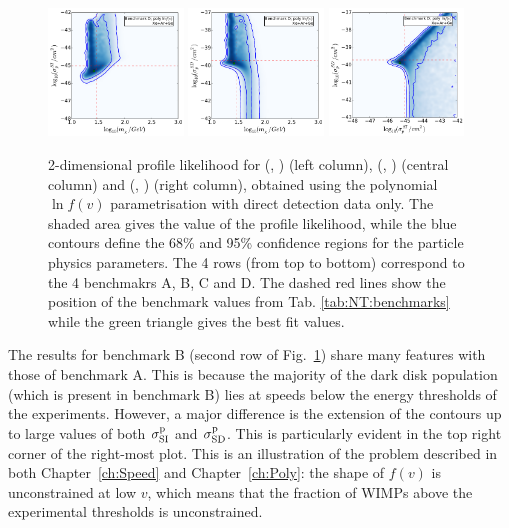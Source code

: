 \begin{figure}[pht!]
  \includegraphics[trim=0.2cm 0.2cm 0.2cm 0.2cm, clip,width=0.32\textwidth]{NT/BenchmarkD_poly_noIC-mx_sigsi.pdf}
  \includegraphics[trim=0.2cm 0.2cm 0.2cm 0.2cm, clip,width=0.32\textwidth]{NT/BenchmarkD_poly_noIC-mx_sigsd.pdf}
  \includegraphics[trim=0.2cm 0.2cm 0.2cm 0.2cm, clip,width=0.32\textwidth]{NT/BenchmarkD_poly_noIC-sigsi_sigsd.pdf}
\caption[Reconstructions of the WIMP mass, SI cross section and SD cross section using direct detection data only]{2-dimensional profile likelihood for (\mchi, \sigmapsi) (left column), (\mchi, \sigmapsd) (central column) and (\sigmapsi, \sigmapsd) (right column), obtained using the polynomial $\ln f(v)$ parametrisation with direct detection data only. The shaded area gives the value of the profile likelihood, while the blue contours define the 68\% and 95\% confidence regions for the particle physics parameters. The 4 rows (from top to bottom) correspond to the 4 benchmakrs A, B, C and D. The dashed red lines show the position of the benchmark values from Tab. \ref{tab:NT:benchmarks} while the green triangle gives the best fit values.}
\label{fig:NT:withoutIC}
\end{figure}

The results for benchmark B (second row of Fig.~\ref{fig:NT:withoutIC}) share many features with those of benchmark A. This is because the majority of the dark disk population (which is present in benchmark B) lies at speeds below the energy thresholds of the experiments. However, a major difference is the extension of the contours up to large values of both $\sigmapsi$ and $\sigmapsd$. This is particularly evident in the top right corner of the right-most plot. This is an illustration of the problem described in both Chapter~\ref{ch:Speed} and Chapter~\ref{ch:Poly}: the shape of $f(v)$ is unconstrained at low $v$, which means that the fraction of WIMPs above the experimental thresholds is unconstrained. 

